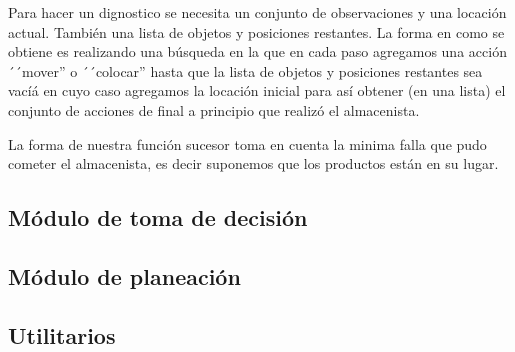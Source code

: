 \documentclass[11pt]{article}
\begin{document}
Para hacer un dignostico se necesita un conjunto de observaciones y una
locación actual. También una lista de objetos y posiciones restantes.
La forma en como se obtiene es realizando una búsqueda en la que en cada
paso agregamos una acción ´´mover'' o ´´colocar'' hasta que la lista de
objetos y posiciones restantes sea vacíá en cuyo caso agregamos la
locación inicial para así obtener (en una lista) el conjunto de acciones
de final a principio que realizó el almacenista.

La forma de nuestra función sucesor toma en cuenta la minima falla que pudo
cometer el almacenista, es decir suponemos que los productos están en su
lugar.

\subsection{Módulo de toma de decisión}

\subsection{Módulo de planeación}


\subsection{Utilitarios}
\end{document}
